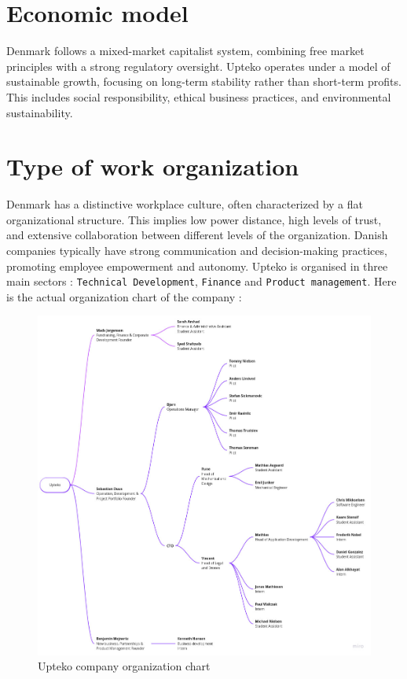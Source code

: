 \section{Economic model}
Denmark follows a mixed-market capitalist system, combining free market principles with a strong regulatory oversight. Upteko operates under a model of sustainable growth, focusing on long-term stability rather than short-term profits. This includes social responsibility, ethical business practices, and environmental sustainability.

\section{Type of work organization}
Denmark has a distinctive workplace culture, often characterized by a flat organizational structure. This implies low power distance, high levels of trust, and extensive collaboration between different levels of the organization. Danish companies typically have strong communication and decision-making practices, promoting employee empowerment and autonomy.
Upteko is organised in three main sectors : \texttt{Technical Development}, \texttt{Finance} and \texttt{Product management}. Here is the actual organization chart of the company :
\begin{figure}[H]
    \centering
    \includegraphics[width=1.0\linewidth]{./company_presentation/upteko_organization.jpg}
    \caption{Upteko company organization chart}
\end{figure}

